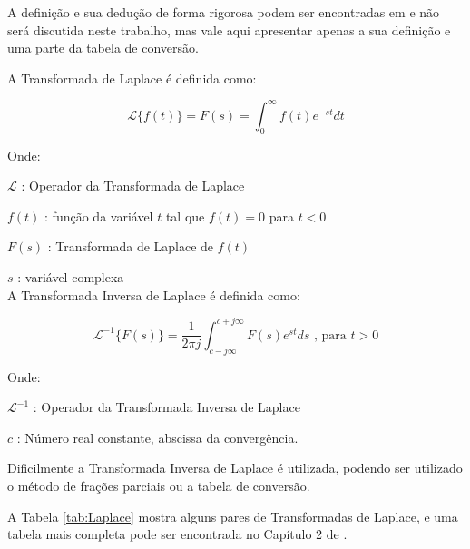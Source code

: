 A definição e sua dedução de forma rigorosa podem ser encontradas em \cite{Ogata} e não será discutida neste trabalho, mas vale aqui apresentar apenas a sua definição e uma parte da tabela de conversão.

A Transformada de Laplace é definida como:

\begin{equation}
\mathscr{L}\{f(t)\} = F(s) = \int_{0}^{\infty} f(t) e^{-st} dt
\label{eq:transfLaplace}
\end{equation} 

Onde:

\setlength{\parindent}{2cm}
$\mathscr{L}$ : Operador da Transformada de Laplace 

$f(t)$ : função da variável $t$ tal que $f(t) = 0$ para $t < 0$ 

$F(s)$ : Transformada de Laplace de $f(t)$

$s$ : variável complexa
\\

\setlength{\parindent}{0cm}
A Transformada Inversa de Laplace é definida como:

\begin{equation}
\mathscr{L}^{-1} \{F(s)\} =  \frac{1}{2 \pi j} \int_{c-j\infty}^{c+j\infty}F(s) e^{st} ds  \text{ , para } t > 0
\label{eq:transfInvLaplace}
\end{equation}

Onde:

\setlength{\parindent}{2cm}
$\mathscr{L}^{-1}$ : Operador da Transformada Inversa de Laplace

$c$ : Número real constante, abscissa da convergência.

\setlength{\parindent}{1cm}

Dificilmente a Transformada Inversa de Laplace é utilizada, podendo ser utilizado o método de frações parciais ou a tabela de conversão.

A Tabela \ref{tab:Laplace} mostra alguns pares de Transformadas de Laplace, e uma tabela mais completa pode ser encontrada no Capítulo 2 de \cite{Ogata}. 

